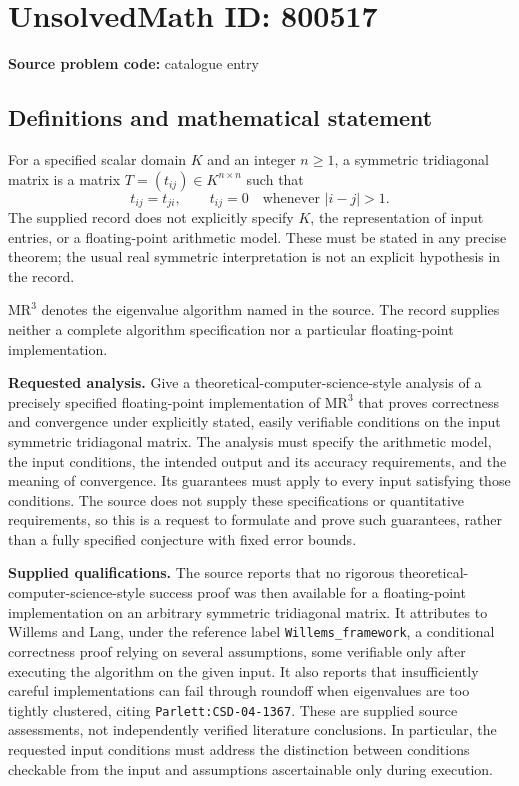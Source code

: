 \documentclass[11pt]{article}
\begin{document}
\section*{UnsolvedMath ID: 800517}
\textbf{Source problem code:} catalogue entry
\subsection{Definitions and mathematical statement}
For a specified scalar domain \(K\) and an integer \(n\geq 1\), a symmetric tridiagonal matrix is a matrix \(T=(t_{ij})\in K^{n\times n}\) such that
\[
 t_{ij}=t_{ji},\qquad t_{ij}=0\quad\text{whenever }|i-j|>1.
\]
The supplied record does not explicitly specify \(K\), the representation of input entries, or a floating-point arithmetic model. These must be stated in any precise theorem; the usual real symmetric interpretation is not an explicit hypothesis in the record.

\(\mathrm{MR}^{3}\) denotes the eigenvalue algorithm named in the source. The record supplies neither a complete algorithm specification nor a particular floating-point implementation.

\textbf{Requested analysis.} Give a theoretical-computer-science-style analysis of a precisely specified floating-point implementation of \(\mathrm{MR}^{3}\) that proves correctness and convergence under explicitly stated, easily verifiable conditions on the input symmetric tridiagonal matrix. The analysis must specify the arithmetic model, the input conditions, the intended output and its accuracy requirements, and the meaning of convergence. Its guarantees must apply to every input satisfying those conditions. The source does not supply these specifications or quantitative requirements, so this is a request to formulate and prove such guarantees, rather than a fully specified conjecture with fixed error bounds.

\textbf{Supplied qualifications.} The source reports that no rigorous theoretical-computer-science-style success proof was then available for a floating-point implementation on an arbitrary symmetric tridiagonal matrix. It attributes to Willems and Lang, under the reference label \texttt{Willems\_framework}, a conditional correctness proof relying on several assumptions, some verifiable only after executing the algorithm on the given input. It also reports that insufficiently careful implementations can fail through roundoff when eigenvalues are too tightly clustered, citing \texttt{Parlett:CSD-04-1367}. These are supplied source assessments, not independently verified literature conclusions. In particular, the requested input conditions must address the distinction between conditions checkable from the input and assumptions ascertainable only during execution.
\end{document}

